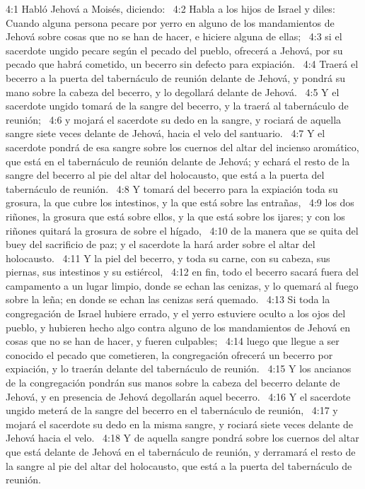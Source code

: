 4:1 Habló Jehová a Moisés, diciendo:  
4:2 Habla a los hijos de Israel y diles: Cuando alguna persona pecare por yerro en alguno de los mandamientos de Jehová sobre cosas que no se han de hacer, e hiciere alguna de ellas;  
4:3 si el sacerdote ungido pecare según el pecado del pueblo, ofrecerá a Jehová, por su pecado que habrá cometido, un becerro sin defecto para expiación.  
4:4 Traerá el becerro a la puerta del tabernáculo de reunión delante de Jehová, y pondrá su mano sobre la cabeza del becerro, y lo degollará delante de Jehová.  
4:5 Y el sacerdote ungido tomará de la sangre del becerro, y la traerá al tabernáculo de reunión;  
4:6 y mojará el sacerdote su dedo en la sangre, y rociará de aquella sangre siete veces delante de Jehová, hacia el velo del santuario.  
4:7 Y el sacerdote pondrá de esa sangre sobre los cuernos del altar del incienso aromático, que está en el tabernáculo de reunión delante de Jehová; y echará el resto de la sangre del becerro al pie del altar del holocausto, que está a la puerta del tabernáculo de reunión.  
4:8 Y tomará del becerro para la expiación toda su grosura, la que cubre los intestinos, y la que está sobre las entrañas,  
4:9 los dos riñones, la grosura que está sobre ellos, y la que está sobre los ijares; y con los riñones quitará la grosura de sobre el hígado,  
4:10 de la manera que se quita del buey del sacrificio de paz; y el sacerdote la hará arder sobre el altar del holocausto.  
4:11 Y la piel del becerro, y toda su carne, con su cabeza, sus piernas, sus intestinos y su estiércol,  
4:12 en fin, todo el becerro sacará fuera del campamento a un lugar limpio, donde se echan las cenizas, y lo quemará al fuego sobre la leña; en donde se echan las cenizas será quemado.  
4:13 Si toda la congregación de Israel hubiere errado, y el yerro estuviere oculto a los ojos del pueblo, y hubieren hecho algo contra alguno de los mandamientos de Jehová en cosas que no se han de hacer, y fueren culpables;  
4:14 luego que llegue a ser conocido el pecado que cometieren, la congregación ofrecerá un becerro por expiación, y lo traerán delante del tabernáculo de reunión.  
4:15 Y los ancianos de la congregación pondrán sus manos sobre la cabeza del becerro delante de Jehová, y en presencia de Jehová degollarán aquel becerro.  
4:16 Y el sacerdote ungido meterá de la sangre del becerro en el tabernáculo de reunión,  
4:17 y mojará el sacerdote su dedo en la misma sangre, y rociará siete veces delante de Jehová hacia el velo.  
4:18 Y de aquella sangre pondrá sobre los cuernos del altar que está delante de Jehová en el tabernáculo de reunión, y derramará el resto de la sangre al pie del altar del holocausto, que está a la puerta del tabernáculo de reunión.  
